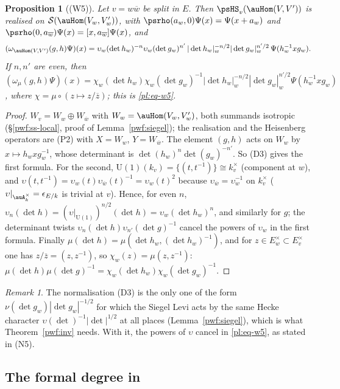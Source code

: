 \documentclass[10pt]{amsart}
\newtheorem{proposition}[theorem]{Proposition}
\theoremstyle{definition}
\theoremstyle{remark}
\newtheorem{remark}[theorem]{Remark}
\providecommand{\auS}{\mathcal S}
\providecommand{\auU}{\mathrm U}
\providecommand{\aubar}[1]{\overline{#1}}
\begin{document}
\begin{proposition}[(W5)]\label{pwf:W5}
Let $v=w\aubar w$ be split in $E$. Then $\psHS_v(\auHom(V,V'))$ is realised on
$\auS(\auHom(V_w,V'_w))$, with $\psrho(a_w,0)\Psi(x)=\Psi(x+a_w)$ and $\psrho(0,a_{\aubar w})\Psi(x)=
[x,a_{\aubar w}]\Psi(x)$, and
\[
(\omega_{\auHom(V,V')}(g,h)\Psi)(x)=\upsilon_w(\det h_w)^{-n}\upsilon_w(\det g_w)^{n'}\,
|\det h_w|_w^{-n/2}|\det g_w|_w^{n'/2}\,\Psi(h_w^{-1}xg_w).
\]
If $n,n'$ are even, then $(\omega_\mu(g,h)\Psi)(x)=\chi_w(\det h_w)\chi_w(\det g_w)^{-1}|\det
h_w|_w^{-n/2}|\det g_w|_w^{n'/2}\Psi(h_w^{-1}xg_w)$, where $\chi=\mu\circ(z\mapsto z/\aubar z)$; this
is \eqref{pl:eq-w5}.
\end{proposition}
\begin{proof}
$W_v=W_w\oplus W_{\aubar w}$ with $W_w=\auHom(V_w,V'_w)$, both summands isotropic
(\S\ref{pwf:ss-local}, proof of Lemma~\ref{pwf:siegel}); the realisation and the Heisenberg operators
are (P2) with $X=W_w$, $Y=W_{\aubar w}$. The element $(g,h)$ acts on $W_w$ by $x\mapsto h_wxg_w^{-1}$,
whose determinant is $\det(h_w)^n\det(g_w)^{-n'}$. So (D3) gives the first formula. For the second,
$\auU(1)(k_v)=\{(t,t^{-1})\}\cong k_v^\times$ (component at $w$), and $\upsilon(t,t^{-1})=\upsilon_w(t)
\upsilon_{\aubar w}(t)^{-1}=\upsilon_w(t)^2$ because $\upsilon_{\aubar w}=\upsilon_w^{-1}$ on $k_v^\times$
($\upsilon|_{\auA_k^\times}=\epsilon_{E/k}$ is trivial at $v$). Hence, for even $n$,
$\upsilon_n(\det h)=(\upsilon|_{\auU(1)})^{n/2}(\det h)=\upsilon_w(\det h_w)^n$, and similarly for
$g$; the determinant twists $\upsilon_n(\det h)\upsilon_{n'}(\det g)^{-1}$ cancel the powers of
$\upsilon_w$ in the first formula. Finally $\mu(\det h)=\mu(\det h_w,(\det h_w)^{-1})$, and for
$z\in E_w^\times\subset E_v^\times$ one has $z/\aubar z=(z,z^{-1})$, so $\chi_w(z)=\mu(z,z^{-1})$:
$\mu(\det h)\mu(\det g)^{-1}=\chi_w(\det h_w)\chi_w(\det g_w)^{-1}$.
\end{proof}

\begin{remark}\label{pwf:rem-W5}
The normalisation (D3) is the only one of the form $\nu(\det g_w)|\det g_w|^{-1/2}$ for which the
Siegel Levi acts by the same Hecke character $\upsilon(\det)^{-1}|\det|^{1/2}$ at all places
(Lemma~\ref{pwf:siegel}), which is what Theorem~\ref{pwf:inv} needs. With it, the powers of
$\upsilon$ cancel in \eqref{pl:eq-w5}, as stated in (N5).
\end{remark}

\subsection{The formal degree in \texorpdfstring{{\cite[Proposition~5.2]{P51}}}{[Moment, Proposition~5.2]}}\label{pwf:ss-haar}
\end{document}
